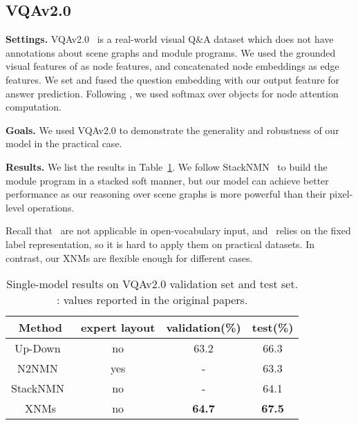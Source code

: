 \documentclass[10pt,twocolumn,letterpaper]{article}
\begin{document}
\subsection{VQAv2.0}
\textbf{Settings.}
VQAv2.0~\cite{goyal2017vqa2} is a real-world visual Q\&A dataset which does not have annotations about scene graphs and module programs.
We used the grounded visual features of \cite{anderson2018bottom} as node features, and concatenated node embeddings as edge features.
We set  and fused the question embedding with our output feature for answer prediction.
Following \cite{anderson2018bottom}, we used softmax over objects for node attention computation.


\textbf{Goals.}
We used VQAv2.0 to demonstrate the generality and robustness of our model in the practical case.

\textbf{Results.}
We list the results in Table~\ref{tab:vqa-results}.
We follow StackNMN~\cite{hu2018explainable} to build the module program in a stacked soft manner, but our model can achieve better performance as our reasoning over scene graphs is more powerful than their pixel-level operations.

Recall that~\cite{johnson2017inferring,mascharka2018transparency} are not applicable in open-vocabulary input, and~\cite{yi2018nsvqa} relies on the fixed label representation, so it is hard to apply them on practical datasets.
In contrast, our XNMs are flexible enough for different cases.

\begin{table}[h]
    \caption{Single-model results on VQAv2.0 validation set and test set. : values reported in the original papers.}
    \centering
    \footnotesize
    \begin{tabular}{|c|c|c|c|}
    \hline
    Method                          &    expert layout   &   validation(\%)   &   test(\%)  \\
    \hline
    Up-Down~\cite{anderson2018bottom}   &   no   &   63.2   &  66.3 \\
    N2NMN~\cite{hu2017learning}    &    yes      &     -    &  63.3   \\
    StackNMN~\cite{hu2018explainable}  &    no   &     -    &  64.1  \\
    XNMs     &     no     &  \textbf{64.7}   &   \textbf{67.5}    \\
    \hline
    \end{tabular}
    \label{tab:vqa-results}
\vspace{-0.4cm}
\end{table}
\end{document}
